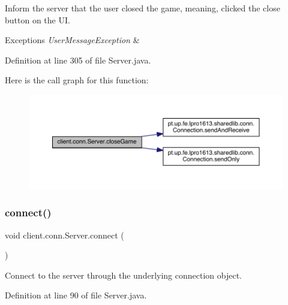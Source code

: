 Inform the server that the user closed the game, meaning, clicked the close button on the UI. 
\begin{DoxyExceptions}{Exceptions}
{\em User\+Message\+Exception} & \\
\hline
\end{DoxyExceptions}


Definition at line 305 of file Server.\+java.

Here is the call graph for this function\+:
\nopagebreak
\begin{figure}[H]
\begin{center}
\leavevmode
\includegraphics[width=350pt]{classclient_1_1conn_1_1_server_a5d1f1961306d3e06c895abc90dfddf9f_cgraph}
\end{center}
\end{figure}
\hypertarget{classclient_1_1conn_1_1_server_a7e96a6bd486520d128a37a8216cf37c3}{}\label{classclient_1_1conn_1_1_server_a7e96a6bd486520d128a37a8216cf37c3} 
\subsubsection{\texorpdfstring{connect()}{connect()}}
{\footnotesize\ttfamily void client.\+conn.\+Server.\+connect (\begin{DoxyParamCaption}{ }\end{DoxyParamCaption})}

Connect to the server through the underlying connection object. 

Definition at line 90 of file Server.\+java.

